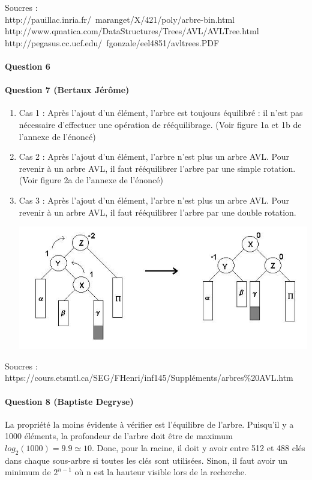 \documentclass[a4paper]{article}
\begin{document}
{\footnotesize Soucres : \\
http://pauillac.inria.fr/~maranget/X/421/poly/arbre-bin.html\\
http://www.qmatica.com/DataStructures/Trees/AVL/AVLTree.html\\
http://pegasus.cc.ucf.edu/~fgonzale/eel4851/avltrees.PDF\\}

\paragraph*{Question 6}
\paragraph*{Question 7 (Bertaux Jérôme)}
\begin{enumerate}
\item Cas 1 :  Après l'ajout d'un élément, l'arbre est toujours équilibré : il n'est pas nécessaire d'effectuer une opération de rééquilibrage. (Voir figure 1a et 1b de l'annexe de l'énoncé)
\item Cas 2 : Après l'ajout d'un élément, l'arbre n'est plus un arbre AVL. Pour revenir à un arbre AVL, il faut rééquilibrer l'arbre par une simple rotation. (Voir figure 2a de l'annexe de l'énoncé)
\item Cas 3 : Après l'ajout d'un élément, l'arbre n'est plus un arbre AVL. Pour revenir à un arbre AVL, il faut rééquilibrer l'arbre par une double rotation.
\begin{center}
\includegraphics[scale=0.5]{double_rotation}
\end{center}
\end{enumerate}
{\footnotesize Soucres : \\
https://cours.etsmtl.ca/SEG/FHenri/inf145/Suppléments/arbres\%20AVL.htm\\}

\paragraph*{Question 8 (Baptiste Degryse)}
La propriété la moins évidente à vérifier est l'équilibre de l'arbre. Puisqu'il y a 1000 éléments, la profondeur de l'arbre doit être de maximum $log_2(1000) = 9.9 \simeq 10 $. Donc, pour la racine, il doit y avoir entre 512 et 488 clés dans chaque sous-arbre si toutes les clés sont utilisées. Sinon, il faut avoir un minimum de $2^{n-1}$ où n est la hauteur visible lors de la recherche.
\end{document}
